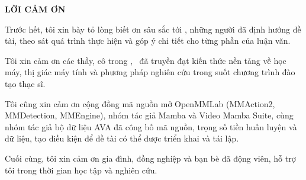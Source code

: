\newpage
\begin{center}
  \textbf{\large LỜI CẢM ƠN}
\end{center}

Trước hết, tôi xin bày tỏ lòng biết ơn sâu sắc tới \thesisAdvisor, những người đã định hướng đề tài, theo sát quá trình thực hiện và góp ý chi tiết cho từng phần của luận văn.

Tôi xin cảm ơn các thầy, cô trong \thesisFaculty, \thesisUniversity\ đã truyền đạt kiến thức nền tảng về học máy, thị giác máy tính và phương pháp nghiên cứu trong suốt chương trình đào tạo thạc sĩ.

Tôi cũng xin cảm ơn cộng đồng mã nguồn mở OpenMMLab (MMAction2, MMDetection, MMEngine), nhóm tác giả Mamba và Video Mamba Suite, cùng nhóm tác giả bộ dữ liệu AVA đã công bố mã nguồn, trọng số tiền huấn luyện và dữ liệu, tạo điều kiện để đề tài có thể được triển khai và tái lập.

Cuối cùng, tôi xin cảm ơn gia đình, đồng nghiệp và bạn bè đã động viên, hỗ trợ tôi trong thời gian học tập và nghiên cứu.

\begin{flushright}
\thesisAuthor
\end{flushright}
\clearpage
